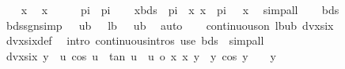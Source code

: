 \begin{isabellebody}
\ \ \isamarkupfalse%
\ x\ \isamarkupfalse%
\ {\isachardoublequoteopen}x\ {\isasymin}\ {\isacharbraceleft}{\kern0pt}{}\ {\isacharslash}{\kern0pt}\ {\isacharparenleft}{\kern0pt}{}\ {\isacharasterisk}{\kern0pt}\ pi{\isacharparenright}{\kern0pt}{\isacharless}{\kern0pt}{\isachardot}{\kern0pt}{\isachardot}{\kern0pt}{\isacharless}{\kern0pt}{}\ {\isacharslash}{\kern0pt}\ pi{\isacharbraceright}{\kern0pt}{\isachardoublequoteclose}\isanewline
\ \ \isamarkupfalse%
\ xbds{\isacharcolon}{\kern0pt}\ {\isachardoublequoteopen}{}\ {\isacharslash}{\kern0pt}{\isacharparenleft}{\kern0pt}{}{\isacharasterisk}{\kern0pt}pi{\isacharparenright}{\kern0pt}\ {\isacharless}{\kern0pt}\ x{\isachardoublequoteclose}\ {\isachardoublequoteopen}x\ {\isacharless}{\kern0pt}\ {}{\isacharslash}{\kern0pt}pi{\isachardoublequoteclose}\ {\isachardoublequoteopen}{}\ {\isacharless}{\kern0pt}\ x{\isachardoublequoteclose}\ \isamarkupfalse%
\ simp{\isacharunderscore}{\kern0pt}all\isanewline
\isanewline
\ \ \isamarkupfalse%
\ bds\ \isamarkupfalse%
\ bdssgn{\isacharbrackleft}{\kern0pt}simp{\isacharbrackright}{\kern0pt}{\isacharcolon}{\kern0pt}\ {\isachardoublequoteopen}{}\ {\isacharless}{\kern0pt}\ ub{\isachardoublequoteclose}\ {\isachardoublequoteopen}{}\ {\isacharless}{\kern0pt}\ lb{\isachardoublequoteclose}\ {\isachardoublequoteopen}{}\ {\isacharless}{\kern0pt}\ {}{\isacharslash}{\kern0pt}ub{\isachardoublequoteclose}\ \isamarkupfalse%
\ auto\isanewline
\ \ \isamarkupfalse%
\ {\isachardoublequoteopen}continuous{\isacharunderscore}{\kern0pt}on\ {\isacharbraceleft}{\kern0pt}lb{\isachardot}{\kern0pt}{\isachardot}{\kern0pt}ub{\isacharbraceright}{\kern0pt}\ dvxsix{\isachardoublequoteclose}\isanewline
\ \ \ \ \isamarkupfalse%
\ dvxsix{\isacharunderscore}{\kern0pt}def\ \isamarkupfalse%
\ {\isacharparenleft}{\kern0pt}intro\ continuous{\isacharunderscore}{\kern0pt}intros{\isacharparenright}{\kern0pt}\ {\isacharparenleft}{\kern0pt}use\ bds\ \ simp{\isacharunderscore}{\kern0pt}all{\isacharparenright}{\kern0pt}\isanewline
\isanewline
\ \ \isamarkupfalse%
\ {\isachardoublequoteopen}dvxsix\ y\ {\isacharequal}{\kern0pt}\ {\isacharparenleft}{\kern0pt}{\isacharparenleft}{\kern0pt}{\isasymlambda}u{\isachardot}{\kern0pt}\ cos\ u\ {\isacharasterisk}{\kern0pt}\ {\isacharparenleft}{\kern0pt}tan\ u\ {\isacharminus}{\kern0pt}\ u{\isacharparenright}{\kern0pt}{\isacharparenright}{\kern0pt}\ o\ {\isacharparenleft}{\kern0pt}{\isasymlambda}x{\isachardot}{\kern0pt}\ {}{\isacharslash}{\kern0pt}x{\isacharparenright}{\kern0pt}{\isacharparenright}{\kern0pt}\ y{\isachardoublequoteclose}\ \ {\isachardoublequoteopen}y{\isasymnoteq}{}{\isachardoublequoteclose}\ {\isachardoublequoteopen}cos\ {\isacharparenleft}{\kern0pt}{}{\isacharslash}{\kern0pt}y{\isacharparenright}{\kern0pt}\ {\isasymnoteq}\ {}{\isachardoublequoteclose}\ \ y\isanewline

\end{isabellebody}
